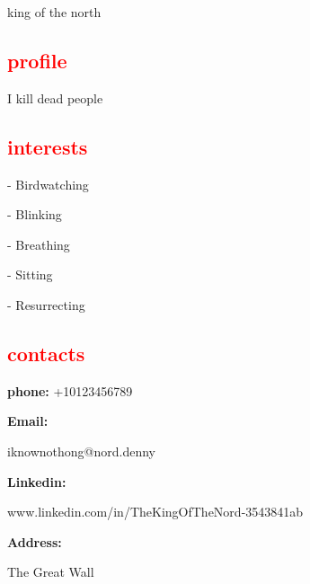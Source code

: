 \documentclass{my_cv}
\begin{document}
\textcolor{red}{\textsf{}}

\begin{tcolorbox}[colframe=white,colback=red!75!green!50,arc=0pt]
king of the north


\end{tcolorbox}

\begin{minipage}{0.30\textwidth}


   \textcolor{red}{\section{profile}} 
    I kill dead people
    \textcolor{red}{\section{interests}} 
    
    - Birdwatching

    - Blinking

    - Breathing
    
    - Sitting
    
    - Resurrecting
    
    \textcolor{red}{\section{contacts}}
    
    \textbf{phone:} +10123456789
    
    \textbf{Email:}
    
    iknownothong@nord.denny
    
    
    \textbf{Linkedin:} 

    www.linkedin.com/in/TheKingOfTheNord-3543841ab
   \
    
    \textbf{Address:}
    
    The Great Wall 
    
\end{minipage} 
\hspace{1cm}\vrule \hspace{1cm} %
\end{document}
